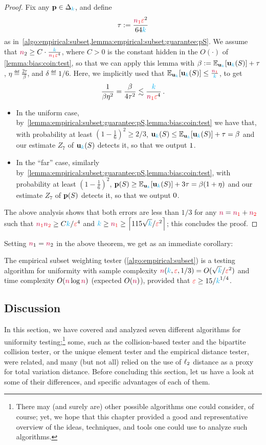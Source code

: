 \begin{proof}
Fix any $\p\in\distribs{\ab}$, and define 
\[
    \tau \eqdef \frac{\nss\dst^2}{64\ab}
\]
as in~\cref{algo:empirical:subset,lemma:empirical:subset:guarantee:pS}. We assume that $\ns_2 \geq C\cdot\frac{\ab}{\nss\dst^4}$, where $C>0$ is the constant hidden in the $O(\cdot)$ of \cref{lemma:bias:coin:test}, so that we can apply this lemma with $\beta \eqdef \bE{\uniform_\ab}{\uniform_\ab(S)} + \tau$, $\eta\eqdef \frac{2\tau}{\beta}$, and $\delta \eqdef 1/6$. Here, we implicitly used that
$
 \bE{\uniform_\ab}{\uniform_\ab(S)} \leq \frac{\nss}{\ab}
$,
to get
\[
    \frac{1}{\beta\eta^2} = \frac{\beta}{4\tau^2} \lesssim \frac{\ab}{\nss\dst^4}\,.
\]
\begin{itemize}
    \item In the uniform case, by~\cref{lemma:empirical:subset:guarantee:pS,lemma:bias:coin:test} we have that, with probability at least $(1-\frac{1}{6})^2 \geq 2/3$,
    $\uniform_\ab(S) \leq \bE{\uniform_\ab}{\uniform_\ab(S)} + \tau = \beta$ and our estimate $Z_7$ of  $\uniform_\ab(S)$ detects it, so that we output $\accept$. 
    \item In the ``far'' case, similarly by~\cref{lemma:empirical:subset:guarantee:pS,lemma:bias:coin:test}, with probability at least $(1-\frac{1}{6})^2$,
    $\p(S) \geq \bE{\uniform_\ab}{\uniform_\ab(S)} + 3\tau = \beta(1+\eta)$ and our estimate $Z_7$ of  $\p(S)$ detects it, so that we output $\reject$. 
\end{itemize}
  The above analysis shows that both errors are less than $1/3$ for any $\ns = \nss+\nst$ such that $\nss\nst \geq C\ab/\dst^4$ and $\ab\geq\nss \geq \clg{115\sqrt{\ab}/\dst^2}$; this concludes the proof.
\end{proof}
Setting $\ns_1=\ns_2$ in the above theorem, we get as an immediate corollary:
\begin{corollary}
  \label{coro:empirical-subset}
The empirical subset weighting tester (\cref{algo:empirical:subset}) is a testing algorithm for uniformity with sample complexity $\ns(\ab,\dst,1/3) = O(\sqrt{\ab}/\dst^2)$ and time complexity $O(\ns\log\ns)$ (expected $O(\ns)$), provided that $\dst \geq 15/\ab^{1/4}$.
\end{corollary}

\subsection{Discussion}
  \label{ssec:uniformity:discussion}
In this section, we have covered and analyzed seven different algorithms for uniformity testing;\footnote{There may (and surely are) other possible algorithms one could consider, of course; yet, we hope that this chapter provided a good and representative overview of the ideas, techniques, and tools one could use to analyze such algorithms.} some, such as the collision-based tester and the bipartite collision tester, or the unique element tester and the empirical distance tester, were related, and many (but not all) relied on the use of $\lp[2]$ distance as a proxy for total variation distance. Before concluding this section, let us have a look at some of their differences, and specific advantages of each of them.

